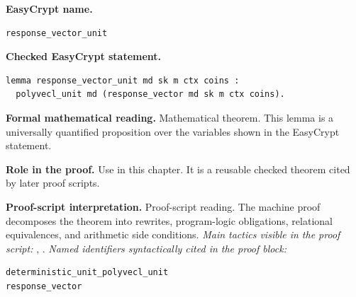 \begin{formaltheorem}
\noindent\textbf{EasyCrypt name.}
\begin{lstlisting}[language=EasyCrypt,basicstyle=\ttfamily\scriptsize]
response_vector_unit
\end{lstlisting}
\noindent\textbf{Checked EasyCrypt statement.}
\begin{lstlisting}[language=EasyCrypt,basicstyle=\ttfamily\scriptsize]
lemma response_vector_unit md sk m ctx coins :
  polyvecl_unit md (response_vector md sk m ctx coins).
\end{lstlisting}
\noindent\textbf{Formal mathematical reading.}
Mathematical theorem. This lemma is a universally quantified proposition over the variables shown in the EasyCrypt statement.

\noindent\textbf{Role in the proof.}
Use in this chapter. It is a reusable checked theorem cited by later proof scripts.

\noindent\textbf{Proof-script interpretation.}
Proof-script reading. The machine proof decomposes the theorem into rewrites, program-logic obligations, relational equivalences, and arithmetic side conditions.
\emph{Main tactics visible in the proof script:} , .
\emph{Named identifiers syntactically cited in the proof block:}
\begin{lstlisting}[language=EasyCrypt,basicstyle=\ttfamily\scriptsize]
deterministic_unit_polyvecl_unit
response_vector
\end{lstlisting}

\end{formaltheorem}

